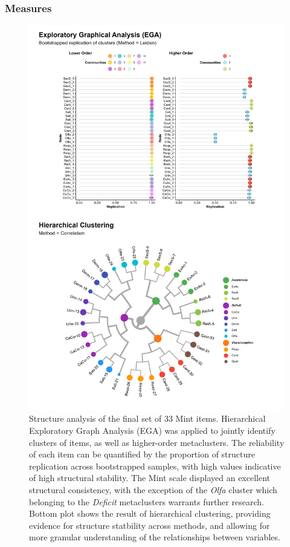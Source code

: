 \documentclass[
  jou,
  floatsintext,
  longtable,
  nolmodern,
  notxfonts,
  notimes,
  colorlinks=true,linkcolor=blue,citecolor=blue,urlcolor=blue]{apa7}
\begin{document}
\subsubsection{Measures}\label{measures}

\begin{figure}[!htbp]

{\caption{{Structure analysis of the final set of 33 Mint items.
Hierarchical Exploratory Graph Analysis (EGA) was applied to jointly
identify clusters of items, as well as higher-order metaclusters. The
reliability of each item can be quantified by the proportion of
structure replication across bootstrapped samples, with high values
indicative of high structural stability. The Mint scale displayed an
excellent structural consistency, with the exception of the \emph{Olfa}
cluster which belonging to the \emph{Deficit} metaclusters warrants
further research. Bottom plot shows the result of hierarchical
clustering, providing evidence for structure statbility across methods,
and allowing for more granular understanding of the relationships
between variables.}{\label{fig-two}}}}

\begin{center}
\includegraphics[width=0.8\linewidth,height=\textheight,keepaspectratio]{../study2/analysis/figures/fig1.png}
\end{center}

\end{figure}
\end{document}
